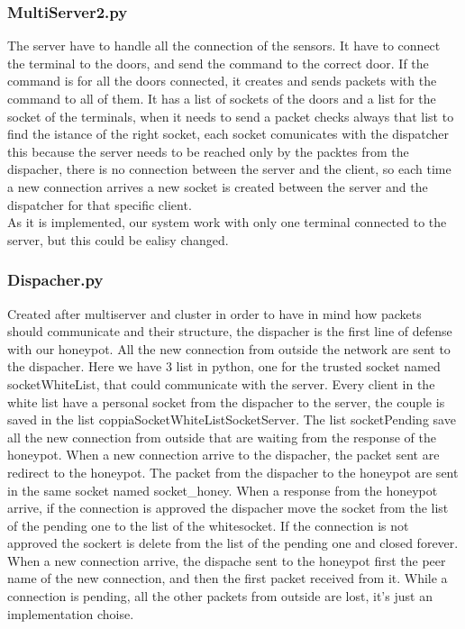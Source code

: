\subsubsection{MultiServer2.py}
The server have to handle all the connection of the sensors. It have to connect the terminal to the doors, and send the command to the correct door. If the command is for all the doors connected, it creates and sends  packets with the command to all of them. It has a list of sockets of the doors and a list for the socket of the terminals, when it needs to send a packet checks always that list to find the istance of the right socket, each socket comunicates with the dispatcher this because the server needs to be reached only by the packtes from the dispacher, there is no connection between the server and the client, so each time a new connection arrives  a new socket is created between the server and the dispatcher for that specific client.\\
 As it is implemented, our system work with only one terminal connected to the server, but this could be ealisy changed. 


\subsubsection{Dispacher.py}
Created after multiserver and cluster in order to have in mind how packets should communicate and their structure, the dispacher is the first line of defense with our honeypot. All the new connection from outside the network are sent to the dispacher. Here we have 3 list in python, one for the trusted socket named socketWhiteList, that could communicate with the server. Every client in the white list have a personal socket from the dispacher to the server, the couple is saved in the list coppiaSocketWhiteListSocketServer. The list socketPending save all the new connection from outside that are waiting from the response of the honeypot. When a new connection arrive to the dispacher, the packet sent are redirect to the honeypot. The packet from the dispacher to the honeypot are sent in the same socket named socket\_honey. When a response from the honeypot arrive, if the connection is approved the dispacher move the socket from the list of the pending one to the list of the whitesocket. If the connection is not approved the sockert is delete from the list of the pending one and closed forever.  When a new connection arrive, the dispache sent to the honeypot first the peer name of the new connection, and then the first packet received from it. While a connection is pending, all the other packets from outside are lost, it's just an implementation choise.

